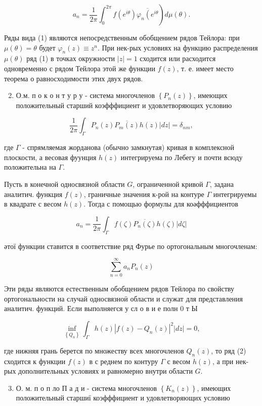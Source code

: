 \documentclass[10pt]{article}
\begin{document}
\[
\left.a_{n}=\frac{1}{2 \pi} \int_{0}^{2 \pi} f\left(e^{i \theta}\right) \overline{\varphi_{n}\left(e^{i \theta}\right.}\right) d \mu(\theta) .
\]

Ряды вида (1) являются непосредственным обобщением рядов Тейлора: при $\mu(\theta)=\theta$ будет $\varphi_{n}(z) \equiv z^{n}$. При нек-рых условиях на функцию распределения $\mu(\theta)$ ряд (1) в точках окружности $|z|=1$ сходится или расходится одновременно с рядом Тейлора этой же функции $f(z)$, т. е. имеет место теорема о равносходимости этих двух рядов.

\begin{enumerate}
  \setcounter{enumi}{1}
  \item О.м. п о к о н т у р у - система многочленов $\left\{P_{n}(z)\right\}$, имеющих положительный старший коэфффициент и удовлетворяющих условию
\end{enumerate}

\[
\frac{1}{2 \pi} \int_{\Gamma} P_{n}(z) \overline{P_{m}(z)} h(z)|d z|=\delta_{n m},
\]

где $\Gamma$ - спрямляемая жорданова (обычно замкнутая) кривая в комплексной плоскости, а весовая фуунция $h(z)$ интегрируема по Лебегу и почти всюду положительна на $\Gamma$.

Пусть в конечной односвязной области $G$, ограниченной кривой $\Gamma$, задана аналитич. функция $f(z)$, граничные значения к-рой на контуре $\Gamma$ интегрируемы в квадрате с весом $h(z)$. Тогда с помощью формулы для коәфффициентов

\[
a_{n}=\frac{1}{2 \pi} \int_{\Gamma} f(\zeta) \overline{P_{n}(\zeta)} h(\zeta)|d \zeta|
\]

әтої функции ставится в соответствие ряд Фурье по ортогональным многочленам:

\[
\sum_{n=0}^{\infty} a_{n} P_{n}(z)
\]

Эти ряды являются естественным обобщением рядов Тейлора по свойству ортогональности на случай односвязноӥ области и служат для представления аналитич. функций. Если выполняегся у сл о в и е полн 0 т Ы

\[
\inf _{\left\{Q_{n}\right\}} \int_{\Gamma} h(z)\left|f(z)-Q_{n}(z)\right|^{2}|d z|=0,
\]

где нижняя грань берется по множеству всех многочленов $Q_{n}(z)$, то ряд (2) сходится к функции $f(z)$ в с реднем по контуру $\Gamma$ с весом $h(z)$, а при нек-рых дополнительных условиях и равномерно внутри области $G$.

\begin{enumerate}
  \setcounter{enumi}{2}
  \item О. м. п о п ло П а д и - система многочленов $\left\{K_{n}(z)\right\}$, имеющих положительный старшиї коэфффициент и удовлетворяющих условию
\end{enumerate}
\end{document}

